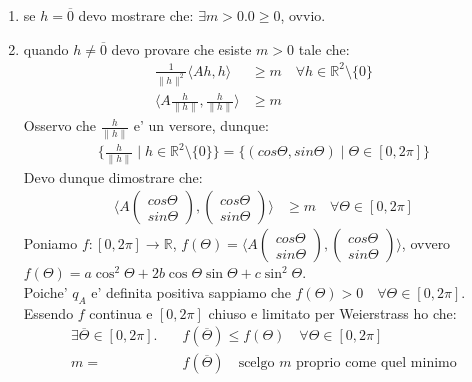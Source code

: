 \documentclass{article}
\begin{document}
\begin{enumerate}
  \item se $h = \overline{0}$ devo mostrare che: $\exists m > 0. 0 \geq 0$, ovvio.
  \item quando $h \neq \overline{0}$ devo provare che esiste $m > 0$ tale che:
    \begin{align*}
      \frac{1}{\|h\|^2} \langle A h, h \rangle &\geq m \quad \forall h \in \mathbb{R}^2 \setminus \{0\} \\
      \langle A \frac{h}{\|h\|}, \frac{h}{\|h\|} \rangle &\geq m
    \end{align*}
    Osservo che $\frac{h}{\|h\|}$ e' un versore, dunque:
    \begin{align*}
      \{ \frac{h}{\|h\|} \mid h \in \mathbb{R}^2\setminus\{0\} \} =
      \{(cos \Theta, sin \Theta) \mid \Theta \in [0, 2\pi]\}
    \end{align*}
    Devo dunque dimostrare che:
    \begin{align*}
      \langle A \begin{pmatrix}cos \Theta \\ sin \Theta \end{pmatrix}, \begin{pmatrix}cos \Theta \\ sin \Theta \end{pmatrix} \rangle &\geq m
      \quad \forall \Theta \in [0, 2\pi]
    \end{align*}
    Poniamo $f: [0, 2\pi] \to \mathbb{R}$, $f(\Theta) = \langle A \begin{pmatrix}cos \Theta \\ sin \Theta \end{pmatrix}, \begin{pmatrix}cos \Theta \\ sin \Theta \end{pmatrix} \rangle$,
    ovvero $f(\Theta) = a \cos^2 \Theta + 2b \cos \Theta \sin \Theta + c \sin^2 \Theta$. \\
    Poiche' $q_A$ e' definita positiva sappiamo che $f(\Theta) > 0 \quad \forall \Theta \in [0,2\pi]$. \\
    Essendo $f$ continua e $[0,2\pi]$ chiuso e limitato per Weierstrass ho che:
    \begin{align*}
      \exists \overline{\Theta} \in [0,2\pi]. \quad &f(\overline{\Theta}) \leq f(\Theta) \quad \forall \Theta \in [0,2\pi] \\
      m = &f(\overline{\Theta}) \quad \text{scelgo } m \text{ proprio come quel minimo}
    \end{align*}

\end{enumerate}
\end{document}
